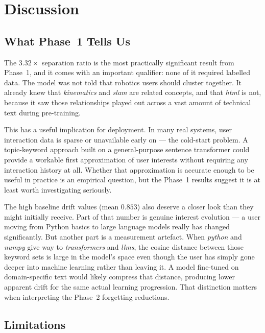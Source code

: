 \documentclass[conference]{IEEEtran}
\begin{document}
\section{Discussion}

\subsection{What Phase~1 Tells Us}

The $3.32\times$ separation ratio is the most practically
significant result from Phase~1, and it comes with an
important qualifier: none of it required labelled data. The
model was not told that robotics users should cluster
together. It already knew that \textit{kinematics} and
\textit{slam} are related concepts, and that \textit{html}
is not, because it saw those relationships played out across
a vast amount of technical text during pre-training.

This has a useful implication for deployment. In many real
systems, user interaction data is sparse or unavailable
early on --- the cold-start problem. A topic-keyword approach
built on a general-purpose sentence transformer could provide
a workable first approximation of user interests without
requiring any interaction history at all. Whether that
approximation is accurate enough to be useful in practice is
an empirical question, but the Phase~1 results suggest it is
at least worth investigating seriously.

The high baseline drift values (mean $0.853$) also deserve
a closer look than they might initially receive. Part of that
number is genuine interest evolution --- a user moving from
Python basics to large language models really has changed
significantly. But another part is a measurement artefact.
When \textit{python} and \textit{numpy} give way to
\textit{transformers} and \textit{llms}, the cosine distance
between those keyword sets is large in the model's space even
though the user has simply gone deeper into machine learning
rather than leaving it. A model fine-tuned on domain-specific
text would likely compress that distance, producing lower
apparent drift for the same actual learning progression.
That distinction matters when interpreting the Phase~2
forgetting reductions.

\subsection{Limitations}
\end{document}
